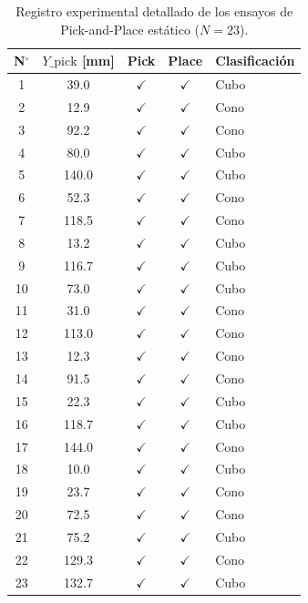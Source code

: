 \documentclass[12pt, a4paper]{report}
\begin{document}
\begin{table}[H]
\centering
\small
\begin{tabular}{|c|c|c|c|l|}
\hline
\textbf{N$^\circ$} & \textbf{$Y\_{\text{pick}}$ [mm]} & \textbf{Pick} & \textbf{Place} & \textbf{Clasificación} \\ \hline
1  & 39.0  & $\checkmark$ & $\checkmark$ & Cubo \\ \hline
2  & 12.9  & $\checkmark$ & $\checkmark$ & Cono \\ \hline
3  & 92.2  & $\checkmark$ & $\checkmark$ & Cono \\ \hline
4  & 80.0  & $\checkmark$ & $\checkmark$ & Cubo \\ \hline
5  & 140.0 & $\checkmark$ & $\checkmark$ & Cubo \\ \hline
6  & 52.3  & $\checkmark$ & $\checkmark$ & Cono \\ \hline
7  & 118.5 & $\checkmark$ & $\checkmark$ & Cono \\ \hline
8  & 13.2  & $\checkmark$ & $\checkmark$ & Cubo \\ \hline
9  & 116.7 & $\checkmark$ & $\checkmark$ & Cubo \\ \hline
10 & 73.0  & $\checkmark$ & $\checkmark$ & Cubo \\ \hline
11 & 31.0  & $\checkmark$ & $\checkmark$ & Cono \\ \hline
12 & 113.0 & $\checkmark$ & $\checkmark$ & Cono \\ \hline
13 & 12.3  & $\checkmark$ & $\checkmark$ & Cono \\ \hline
14 & 91.5  & $\checkmark$ & $\checkmark$ & Cono \\ \hline
15 & 22.3  & $\checkmark$ & $\checkmark$ & Cubo \\ \hline
16 & 118.7 & $\checkmark$ & $\checkmark$ & Cubo \\ \hline
17 & 144.0 & $\checkmark$ & $\checkmark$ & Cono \\ \hline
18 & 10.0  & $\checkmark$ & $\checkmark$ & Cubo \\ \hline
19 & 23.7  & $\checkmark$ & $\checkmark$ & Cono \\ \hline
20 & 72.5  & $\checkmark$ & $\checkmark$ & Cono \\ \hline
21 & 75.2  & $\checkmark$ & $\checkmark$ & Cubo \\ \hline
22 & 129.3 & $\checkmark$ & $\checkmark$ & Cono \\ \hline
23 & 132.7 & $\checkmark$ & $\checkmark$ & Cubo \\ \hline
\end{tabular}
\caption{Registro experimental detallado de los ensayos de Pick-and-Place estático ($N = 23$).}
\label{tab:registro_estatico_manual}
\end{table}
\end{document}
